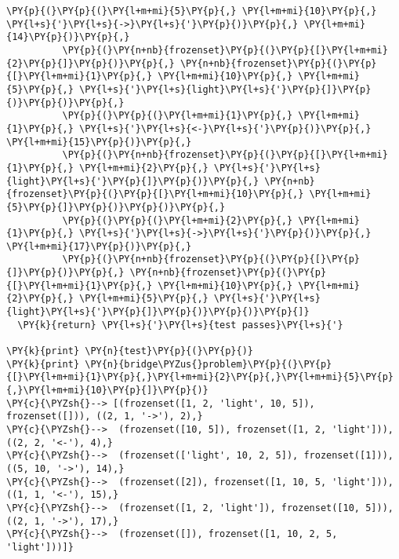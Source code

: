 \begin{Verbatim}[commandchars=\\\{\}]
          \PY{p}{(}\PY{p}{(}\PY{l+m+mi}{5}\PY{p}{,} \PY{l+m+mi}{10}\PY{p}{,} \PY{l+s}{'}\PY{l+s}{->}\PY{l+s}{'}\PY{p}{)}\PY{p}{,} \PY{l+m+mi}{14}\PY{p}{)}\PY{p}{,} 
          \PY{p}{(}\PY{n+nb}{frozenset}\PY{p}{(}\PY{p}{[}\PY{l+m+mi}{2}\PY{p}{]}\PY{p}{)}\PY{p}{,} \PY{n+nb}{frozenset}\PY{p}{(}\PY{p}{[}\PY{l+m+mi}{1}\PY{p}{,} \PY{l+m+mi}{10}\PY{p}{,} \PY{l+m+mi}{5}\PY{p}{,} \PY{l+s}{'}\PY{l+s}{light}\PY{l+s}{'}\PY{p}{]}\PY{p}{)}\PY{p}{)}\PY{p}{,} 
          \PY{p}{(}\PY{p}{(}\PY{l+m+mi}{1}\PY{p}{,} \PY{l+m+mi}{1}\PY{p}{,} \PY{l+s}{'}\PY{l+s}{<-}\PY{l+s}{'}\PY{p}{)}\PY{p}{,} \PY{l+m+mi}{15}\PY{p}{)}\PY{p}{,} 
          \PY{p}{(}\PY{n+nb}{frozenset}\PY{p}{(}\PY{p}{[}\PY{l+m+mi}{1}\PY{p}{,} \PY{l+m+mi}{2}\PY{p}{,} \PY{l+s}{'}\PY{l+s}{light}\PY{l+s}{'}\PY{p}{]}\PY{p}{)}\PY{p}{,} \PY{n+nb}{frozenset}\PY{p}{(}\PY{p}{[}\PY{l+m+mi}{10}\PY{p}{,} \PY{l+m+mi}{5}\PY{p}{]}\PY{p}{)}\PY{p}{)}\PY{p}{,} 
          \PY{p}{(}\PY{p}{(}\PY{l+m+mi}{2}\PY{p}{,} \PY{l+m+mi}{1}\PY{p}{,} \PY{l+s}{'}\PY{l+s}{->}\PY{l+s}{'}\PY{p}{)}\PY{p}{,} \PY{l+m+mi}{17}\PY{p}{)}\PY{p}{,} 
          \PY{p}{(}\PY{n+nb}{frozenset}\PY{p}{(}\PY{p}{[}\PY{p}{]}\PY{p}{)}\PY{p}{,} \PY{n+nb}{frozenset}\PY{p}{(}\PY{p}{[}\PY{l+m+mi}{1}\PY{p}{,} \PY{l+m+mi}{10}\PY{p}{,} \PY{l+m+mi}{2}\PY{p}{,} \PY{l+m+mi}{5}\PY{p}{,} \PY{l+s}{'}\PY{l+s}{light}\PY{l+s}{'}\PY{p}{]}\PY{p}{)}\PY{p}{)}\PY{p}{]}
  \PY{k}{return} \PY{l+s}{'}\PY{l+s}{test passes}\PY{l+s}{'}

\PY{k}{print} \PY{n}{test}\PY{p}{(}\PY{p}{)}
\PY{k}{print} \PY{n}{bridge\PYZus{}problem}\PY{p}{(}\PY{p}{[}\PY{l+m+mi}{1}\PY{p}{,}\PY{l+m+mi}{2}\PY{p}{,}\PY{l+m+mi}{5}\PY{p}{,}\PY{l+m+mi}{10}\PY{p}{]}\PY{p}{)}
\PY{c}{\PYZsh{}--> [(frozenset([1, 2, 'light', 10, 5]), frozenset([])), ((2, 1, '->'), 2),}
\PY{c}{\PYZsh{}-->  (frozenset([10, 5]), frozenset([1, 2, 'light'])), ((2, 2, '<-'), 4),}
\PY{c}{\PYZsh{}-->  (frozenset(['light', 10, 2, 5]), frozenset([1])), ((5, 10, '->'), 14),}
\PY{c}{\PYZsh{}-->  (frozenset([2]), frozenset([1, 10, 5, 'light'])), ((1, 1, '<-'), 15),}
\PY{c}{\PYZsh{}-->  (frozenset([1, 2, 'light']), frozenset([10, 5])), ((2, 1, '->'), 17),}
\PY{c}{\PYZsh{}-->  (frozenset([]), frozenset([1, 10, 2, 5, 'light']))]}
\end{Verbatim}
